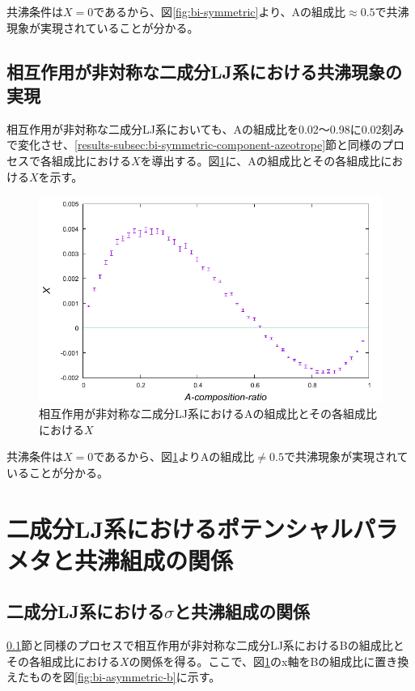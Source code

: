 \documentclass[titlepage]{jsreport}
\begin{document}
\newpage
共沸条件は$X=0$であるから、図\ref{fig:bi-symmetric}より、Aの組成比$\approx0.5$で共沸現象が実現されていることが分かる。

\newpage
\subsection{相互作用が非対称な二成分LJ系における共沸現象の実現} \label{results-subsec:bi-asymmetric-component-azeotrope}
相互作用が非対称な二成分LJ系においても、Aの組成比を0.02〜0.98に0.02刻みで変化させ、\ref{results-subsec:bi-symmetric-component-azeotrope}節と同様のプロセスで各組成比における$X$を導出する。図\ref{fig:bi-asymmetric}に、Aの組成比とその各組成比における$X$を示す。

\begin{figure}[htbp]
    \begin{center}
        \includegraphics[width=14cm]{fig/bi-asymmetric/L100T1.0E1.05.pdf}
    \end{center}
    \caption{相互作用が非対称な二成分LJ系におけるAの組成比とその各組成比における$X$}
    \label{fig:bi-asymmetric}
\end{figure}

共沸条件は$X=0$であるから、図\ref{fig:bi-asymmetric}よりAの組成比$\neq0.5$で共沸現象が実現されていることが分かる。

\newpage
\section{二成分LJ系におけるポテンシャルパラメタと共沸組成の関係} \label{results-sec:bi-component-potential-parameter-azeotrope-ratio}
\subsection{二成分LJ系における$\sigma$と共沸組成の関係} \label{results-subsec:bi-component-sigma-azeotrope-ratio}
\ref{results-subsec:bi-asymmetric-component-azeotrope}節と同様のプロセスで相互作用が非対称な二成分LJ系におけるBの組成比とその各組成比における$X$の関係を得る。ここで、図\ref{fig:bi-asymmetric}のx軸をBの組成比に置き換えたものを図\ref{fig:bi-asymmetric-b}に示す。
\end{document}
